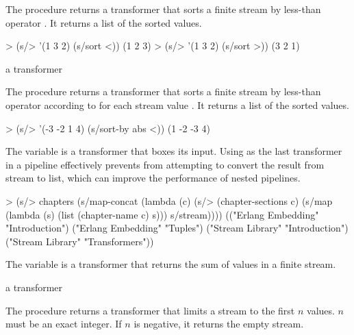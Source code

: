 The  procedure returns a transformer that sorts a finite stream by less-than
operator . It returns a list of the sorted values.

\codebegin
> (s/> '(1 3 2) (s/sort <))
(1 2 3)
> (s/> '(1 3 2) (s/sort >))
(3 2 1)
\codeend

\begin{procedure}
\end{procedure}
\returns{} a transformer

The  procedure returns a transformer that sorts a finite stream by
less-than operator  according to  for each stream
value . It returns a list of the sorted values.

\codebegin
> (s/> '(-3 -2 1 4) (s/sort-by abs <))
(1 -2 -3 4)
\codeend

\begin{variable}
\end{variable}
\antipar

The  variable is a transformer that boxes its input. Using 
as the last transformer in a pipeline effectively prevents  from attempting to
convert the result from stream to list, which can improve the performance of nested pipelines.

\codebegin
> (s/> chapters
    (s/map-concat
     (lambda (c)
       (s/> (chapter-sections c)
         (s/map (lambda (s) (list (chapter-name c) s)))
         s/stream))))
(("Erlang Embedding" "Introduction")
 ("Erlang Embedding" "Tuples")
 ("Stream Library" "Introduction")
 ("Stream Library" "Transformers"))
\codeend

\begin{variable}
\end{variable}
\antipar

The  variable is a transformer that returns the sum of values in a finite
stream.

\begin{procedure}
\end{procedure}
\returns{} a transformer

The  procedure returns a transformer that limits a stream to the first $n$
values. $n$ must be an exact integer. If $n$ is negative, it returns the empty stream.

